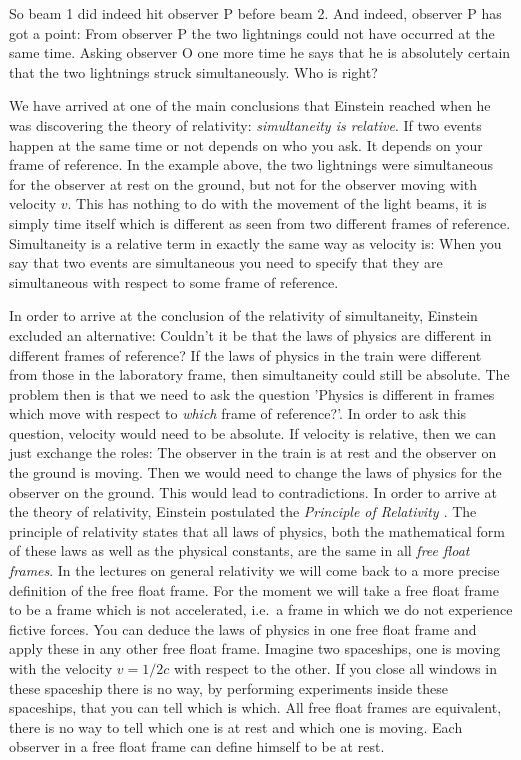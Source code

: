 {\begin{multicols}{2}
So beam 1 did indeed hit observer P before beam 2. And indeed, observer P has got a point: From observer P the two lightnings could not have occurred at the same time. Asking observer O one more time he says that he is absolutely certain that the two lightnings struck simultaneously. Who is right?

We have arrived at one of the main conclusions that Einstein reached when he was discovering the theory of relativity: \emph{simultaneity is relative}. If two events happen at the same time or not depends on who you ask. It depends on your frame of reference. In the example above, the two lightnings were simultaneous for the observer at rest on the ground, but not for the observer moving with velocity $v$. This has nothing to do with the movement of the light beams, it is simply time itself which is different as seen from two different frames of reference. Simultaneity is a relative term in exactly the same way as velocity is: When you say that two events are simultaneous you need to specify that they are simultaneous with respect to some frame of reference.

In order to arrive at the conclusion of the relativity of simultaneity, Einstein excluded an alternative: Couldn't it be that the laws of physics are different in different frames of reference? If the laws of physics in the train were different from those in the laboratory frame, then simultaneity could still be absolute. The problem then is that we need to ask the question 'Physics is different in frames which move with respect to {\it which} frame of reference?'. In order to ask this question, velocity would need to be absolute. If velocity is relative, then we can just exchange the roles: The observer in the train is at rest and the observer on the ground is moving. Then we would need to change the laws of physics for the observer on the ground. This would lead to contradictions. In order to arrive at the theory of relativity, Einstein postulated the {\it Principle of Relativity \label{pg:por}}. The principle of relativity states that all laws of physics, both the mathematical form of these laws as well as the physical constants, are the same in all {\it free float frames\label{pg:ff}}. In the lectures on general relativity we will come back to a more precise definition of the free float frame. For the moment we will take a free float frame to be a frame which is not accelerated, i.e.\ a frame in which we do not experience fictive forces. You can deduce the laws of physics in one free float frame and apply these in any other free float frame. Imagine two spaceships, one is moving with the velocity $v=1/2c$ with respect to the other. If you close all windows in these spaceship there is no way, by performing experiments inside these spaceships, that you can tell which is which. All free float frames are equivalent, there is no way to tell which one is at rest and which one is moving. Each observer in a free float frame can define himself to be at rest.


\end{multicols}}
